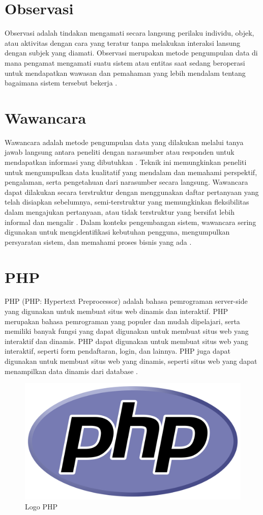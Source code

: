 \section{Observasi}
Observasi adalah tindakan mengamati secara langsung perilaku individu, objek, atau aktivitas dengan cara yang teratur tanpa melakukan interaksi lansung dengan subjek yang diamati. Observasi merupakan metode pengumpulan data di mana pengamat mengamati suatu sistem atau entitas saat sedang beroperasi untuk mendapatkan wawasan dan pemahaman yang lebih mendalam tentang bagaimana sistem tersebut bekerja \cite{tilley2017systems}.

\section{Wawancara}
Wawancara adalah metode pengumpulan data yang dilakukan melalui tanya jawab langsung antara peneliti dengan narasumber atau responden untuk mendapatkan informasi yang dibutuhkan \cite{monday2020impacts}. Teknik ini memungkinkan peneliti untuk mengumpulkan data kualitatif yang mendalam dan memahami perspektif, pengalaman, serta pengetahuan dari narasumber secara langsung. Wawancara dapat dilakukan secara terstruktur dengan menggunakan daftar pertanyaan yang telah disiapkan sebelumnya, semi-terstruktur yang memungkinkan fleksibilitas dalam mengajukan pertanyaan, atau tidak terstruktur yang bersifat lebih informal dan mengalir \cite{balza2022effective}. Dalam konteks pengembangan sistem, wawancara sering digunakan untuk mengidentifikasi kebutuhan pengguna, mengumpulkan persyaratan sistem, dan memahami proses bisnis yang ada \cite{rueda2020requirements}.

\section{PHP}
PHP (PHP: Hypertext Preprocessor) adalah bahasa pemrograman server-side yang digunakan untuk membuat situs web dinamis dan interaktif. PHP merupakan bahasa pemrograman yang populer dan mudah dipelajari, serta memiliki banyak fungsi yang dapat digunakan untuk membuat situs web yang interaktif dan dinamis. PHP dapat digunakan untuk membuat situs web yang interaktif, seperti form pendaftaran, login, dan lainnya. PHP juga dapat digunakan untuk membuat situs web yang dinamis, seperti situs web yang dapat menampilkan data dinamis dari database \cite{irawan2017implementasi}.

\begin{figure}
	\centering
	\includegraphics[width=0.30\linewidth]{konten//gambar/logo-php.png}
	\caption{Logo PHP}
	\label{fig:enter-label}
\end{figure}

